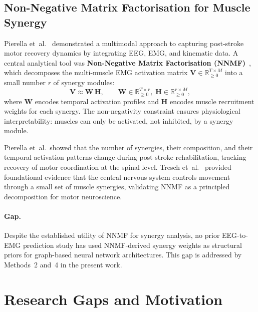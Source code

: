 \documentclass[12pt, a4paper]{article}
\newcommand{\R}{\mathbb{R}}
\begin{document}
	\subsection{Non-Negative Matrix Factorisation for Muscle Synergy}
	
	Pierella et~al.~\cite{pierella2020} demonstrated a multimodal approach to
	capturing post-stroke motor recovery dynamics by integrating EEG, EMG, and
	kinematic data. A central analytical tool was \textbf{Non-Negative Matrix
	Factorisation (NNMF)}~\cite{lee1999}, which decomposes the multi-muscle EMG
	activation matrix $\bm{V} \in \R_{\geq 0}^{T \times M}$ into a small
	number $r$ of synergy modules:
	\begin{equation}
		\bm{V} \approx \bm{W}\,\bm{H},
		\qquad \bm{W} \in \R_{\geq 0}^{T \times r},\;
		\bm{H} \in \R_{\geq 0}^{r \times M},
		\label{eq:bg_nnmf}
	\end{equation}
	where $\bm{W}$ encodes temporal activation profiles and $\bm{H}$ encodes
	muscle recruitment weights for each synergy. The non-negativity constraint
	ensures physiological interpretability: muscles can only be activated, not
	inhibited, by a synergy module.
	
	Pierella et~al.\ showed that the number of synergies, their composition,
	and their temporal activation patterns change during post-stroke
	rehabilitation, tracking recovery of motor coordination at the spinal level.
	Tresch et~al.~\cite{tresch2006} provided foundational evidence that the
	central nervous system controls movement through a small set of
	muscle synergies, validating NNMF as a principled decomposition for
	motor neuroscience.
	
	\paragraph{Gap.}
	Despite the established utility of NNMF for synergy analysis, no prior
	EEG-to-EMG prediction study has used NNMF-derived synergy weights as
	structural priors for graph-based neural network architectures. This gap
	is addressed by Methods~2 and~4 in the present work.
	
	\section{Research Gaps and Motivation}
	
\end{document}
